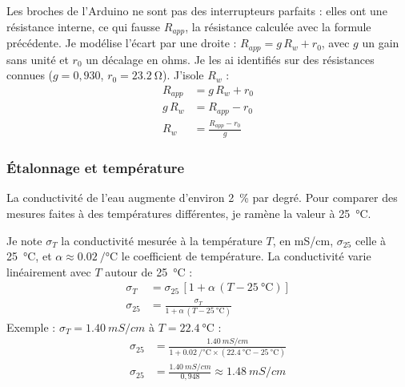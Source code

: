 \begin{demonstration}
Les broches de l'Arduino ne sont pas des interrupteurs parfaits : elles ont une résistance interne, ce qui fausse $R_{app}$, la résistance calculée avec la formule précédente. Je modélise l'écart par une droite : $R_{app} = g\,R_w + r_0$, avec $g$ un gain sans unité et $r_0$ un décalage en ohms. Je les ai identifiés sur des résistances connues ($g = 0{,}930$, $r_0 = \qty{23,2}{\ohm}$). J'isole $R_w$ :
\begin{align*}
R_{app} &= g\,R_w + r_0\\
g\,R_w &= R_{app} - r_0\\
R_w &= \frac{R_{app} - r_0}{g}
\end{align*}
\end{demonstration}

\subsubsection*{Étalonnage et température}

La conductivité de l'eau augmente d'environ \qty{2}{\percent} par degré. Pour comparer des mesures faites à des températures différentes, je ramène la valeur à \qty{25}{\celsius}.

\begin{demonstration}
Je note $\sigma_T$ la conductivité mesurée à la température $T$, en mS/cm, $\sigma_{25}$ celle à \qty{25}{\celsius}, et $\alpha \approx \qty{0,02}{/\celsius}$ le coefficient de température. La conductivité varie linéairement avec $T$ autour de \qty{25}{\celsius} :
\begin{align*}
\sigma_T &= \sigma_{25}\,\left[1 + \alpha\,(T - \qty{25}{\celsius})\right]\\
\sigma_{25} &= \frac{\sigma_T}{1 + \alpha\,(T - \qty{25}{\celsius})}
\end{align*}
Exemple : $\sigma_T = \qty{1,40}{mS/cm}$ à $T = \qty{22,4}{\celsius}$ :
\begin{align*}
\sigma_{25} &= \frac{\qty{1,40}{mS/cm}}{1 + \qty{0,02}{/\celsius} \times (\qty{22,4}{\celsius} - \qty{25}{\celsius})}\\
\sigma_{25} &= \frac{\qty{1,40}{mS/cm}}{0{,}948} \approx \qty{1,48}{mS/cm}
\end{align*}
\end{demonstration}

